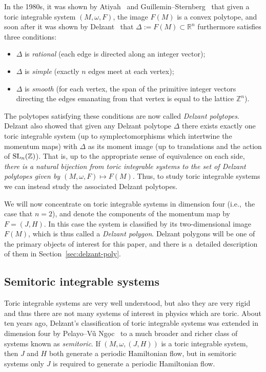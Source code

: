 \documentclass[10pt,a4paper]{amsart}
\numberwithin{equation}{section}
\def\R{{\mathbb R}}
\def\Z{{\mathbb Z}}
\newcommand{\De}{\Delta}
\newcommand{\om}{\omega}
\newcommand{\SLn}{{\rm SL}_n(\Z)}
\theoremstyle{definition}
\theoremstyle{plain}
\theoremstyle{plain}
\begin{document}
In the 1980s, it was shown by Atiyah~\cite{Atiyah} and Guillemin--Sternberg~\cite{GuSt1982} that given a toric integrable system $(M,\om,F)$, the image $F(M)$ is a convex polytope, and soon after it was shown by Delzant~\cite{De1988} that $\Delta:= F(M)\subset \R^n$ furthermore satisfies three conditions:
\begin{itemize}\itemsep=0pt
 \item $\De$ is \emph{rational} (each edge is directed along an integer vector);
 \item $\De$ is \emph{simple} (exactly $n$ edges meet at each vertex);
 \item $\De$ is \emph{smooth} (for each vertex, the span of the primitive integer vectors directing the edges emanating from that vertex is equal to the lattice $\Z^n$).
\end{itemize}
The polytopes satisfying these conditions are now called \emph{Delzant polytopes}.
Delzant also showed that given any Delzant polytope $\Delta$ there exists exactly one toric integrable system (up to symplectomorphisms which intertwine the momentum maps) with $\Delta$ as its moment image (up to translations and the action of $\SLn$).
That is, up to the appropriate sense of equivalence on each side, \emph{there is a natural bijection from toric integrable systems to the set of Delzant polytopes given by $(M,\om,F)\mapsto F(M)$}. Thus, to study toric integrable systems we can instead study the associated Delzant polytopes.


We will now concentrate on toric integrable systems in dimension four (i.e.,~the case that $n=2$), and denote the components of the momentum map by $F=(J,H)$. In this case the system is classified by its two-dimensional image $F(M)$, which is thus called a \emph{Delzant polygon}. Delzant polygons will be one of the primary objects of interest for this paper, and there is a~detailed description of them in Section~\ref{sec:delzant-poly}.



\subsection{Semitoric integrable systems}


Toric integrable systems are very well understood, but also they are very rigid and thus there are not many systems of interest in physics which are toric.
About ten years ago, Delzant's classification of toric integrable systems was extended in dimension four by Pelayo--V\~{u} Ng\d{o}c~\mbox{\cite{PeVN2009, PeVN2011}} to a much broader and richer class of systems known as \emph{semitoric}.
If $(M,\om,(J,H))$ is a toric integrable system, then $J$ and $H$ both generate a periodic Hamiltonian flow, but in semitoric systems only $J$ is required to generate a periodic Hamiltonian flow.
\end{document}
